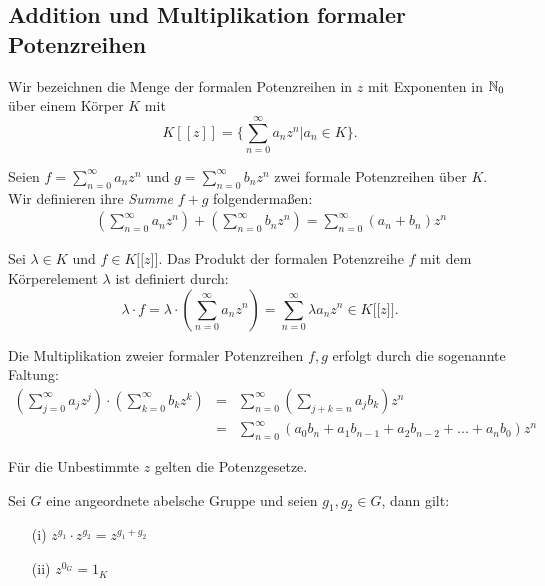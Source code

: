 \subsection{Addition und Multiplikation formaler Potenzreihen} \label{Rechnen}
Wir bezeichnen die Menge der formalen Potenzreihen in $z$ mit Exponenten in $\mathbb{N}_0$ über einem Körper $K$ mit \[K [[z]] = \lbrace \sum_{n=0}^\infty a_n z^n \vert a_n\in K \rbrace. \]
%
%
%
%
\begin{defn}\label{AdditionPotenzreihen}
%
Seien $f = \sum_{n=0}^\infty a_n z^n$ und $g = \sum_{n=0}^\infty b_n z^n$ zwei formale Potenzreihen über $K$. Wir definieren ihre \textit{Summe} $f+g$ folgendermaßen:
\begin{eqnarray*}
&&\left( \sum_{n=0}^\infty a_n z^n \right) + \left( \sum_{n=0}^\infty b_n z^n \right) = \sum_{n=0}^{\infty} (a_n + b_n) z^n 
\end{eqnarray*}
\end{defn}
%
%
% 
\begin{defn}\label{MultiplikationKPotenzreihen}
Sei $\lambda \in K$ und $f \in K\lbrack\lbrack z \rbrack\rbrack$. Das Produkt der formalen Potenzreihe $f$ mit dem Körperelement $\lambda$ ist definiert durch:
\[\lambda\cdot f = \lambda\cdot \left(\sum_{n=0}^{\infty}a_nz^n\right) = \sum_{n=0}^{\infty} \lambda a_nz^n \in K\lbrack\lbrack z\rbrack\rbrack. 
\]
\end{defn}
%
%
\begin{defn}\label{MultiplikationPotenzreihen}
Die Multiplikation zweier formaler Potenzreihen $f,g$ erfolgt durch die sogenannte Faltung:
\begin{eqnarray*}
\left( \sum_{j=0}^\infty a_j z^j \right)\cdot \left( \sum_{k=0}^\infty b_k z^k \right) &=&\sum_{n=0}^\infty \left(\sum_{j+k=n} a_j b_k\right) z^n \\
&=& \sum_{n= 0}^\infty \left(a_0b_n + a_1b_{n-1} + a_2b_{n-2} + ... + a_nb_0 \right)z^n
\end{eqnarray*}
\end{defn}
%
Für die Unbestimmte $z$ gelten die Potenzgesetze.
\begin{bem}[Potenzgesetze]\label{Potenzgesetze}
Sei $G$ eine angeordnete abelsche Gruppe und seien $g_1, g_2 \in G$, dann gilt:
\begin{itemize}
\item[(i)] $z^{g_1} \cdot z^{g_2} = z^{g_1 + g_2}$
\item[(ii)] $z^{0_G} = 1_K$
\end{itemize}
\end{bem}

